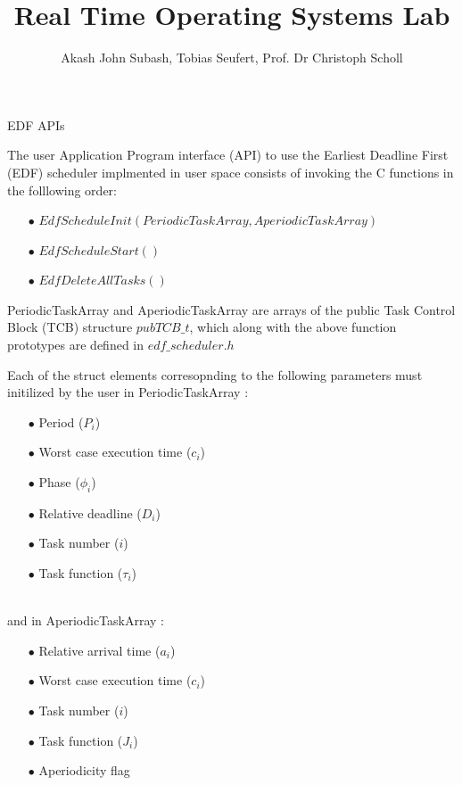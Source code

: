 \documentclass[10pt]{beamer}
\title[Real Time Operating Systems Lab]{ Real Time Operating Systems Lab}
\author {Akash John Subash, Tobias Seufert, Prof. Dr Christoph Scholl}
\institute {Chair of Operating Systems}
\begin{document}
\begin{frame}{\small{EDF APIs}}
	\footnotesize{
		 The user Application Program interface (API) to use the Earliest Deadline First (EDF) scheduler implmented in user space consists of invoking the C functions in the folllowing order:\\
	\begin{itemize}
		\item[$\bullet$] $EdfScheduleInit(PeriodicTaskArray, AperiodicTaskArray)$\\
		\item[$\bullet$] $EdfScheduleStart()$\\
		\item[$\bullet$] $EdfDeleteAllTasks()$\\
	\end{itemize}

	 PeriodicTaskArray and AperiodicTaskArray are arrays of the public Task Control Block (TCB) structure $pubTCB\_t$, which along with the above function prototypes are defined in $edf\_scheduler.h$\\
	}%
\end{frame}

\begin{frame}
	\footnotesize{
	Each of the struct elements corresopnding to the following parameters must initilized by the user in PeriodicTaskArray :\\
	\begin{itemize}
		\item[$\bullet$] Period ($P_{i}$) \\
		\item[$\bullet$] Worst case execution time ($c_{i}$) \\
		\item[$\bullet$] Phase ($\phi_{i}$)\\
		\item[$\bullet$] Relative deadline ($D_{i}$)
		\item[$\bullet$] Task number (${i}$)\\
		\item[$\bullet$] Task function ($\tau_{i}$)\\
	\end{itemize}\\

	\hfill\break
	and in AperiodicTaskArray :\\
	\begin{itemize}
		\item[$\bullet$] Relative arrival time ($a_{i}$) \\
		\item[$\bullet$] Worst case execution time  ($c_{i}$)\\
		\item[$\bullet$] Task number (${i}$)\\
		\item[$\bullet$] Task function ($J_{i}$)\\
		\item[$\bullet$] Aperiodicity flag\\
	\end{itemize}
	} %
\end{frame}
\end{document}

